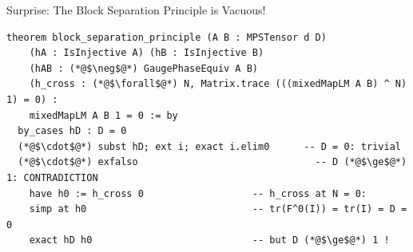 \documentclass[aspectratio=169,10pt]{beamer}
\begin{document}
\begin{frame}[fragile]{Surprise: The Block Separation Principle is Vacuous!}
\vspace{-0.3em}
\begin{lstlisting}[basicstyle=\ttfamily\fontsize{5.5}{7}\selectfont\color{white}]
theorem block_separation_principle (A B : MPSTensor d D)
    (hA : IsInjective A) (hB : IsInjective B)
    (hAB : (*@$\neg$@*) GaugePhaseEquiv A B)
    (h_cross : (*@$\forall$@*) N, Matrix.trace (((mixedMapLM A B) ^ N) 1) = 0) :
    mixedMapLM A B 1 = 0 := by
  by_cases hD : D = 0
  (*@$\cdot$@*) subst hD; ext i; exact i.elim0      -- D = 0: trivial
  (*@$\cdot$@*) exfalso                               -- D (*@$\ge$@*) 1: CONTRADICTION
    have h0 := h_cross 0                   -- h_cross at N = 0:
    simp at h0                             -- tr(F^0(I)) = tr(I) = D = 0
    exact hD h0                            -- but D (*@$\ge$@*) 1 !
\end{lstlisting}

\vspace{0.3em}
\begin{center}
\end{center}
\end{frame}
\end{document}
